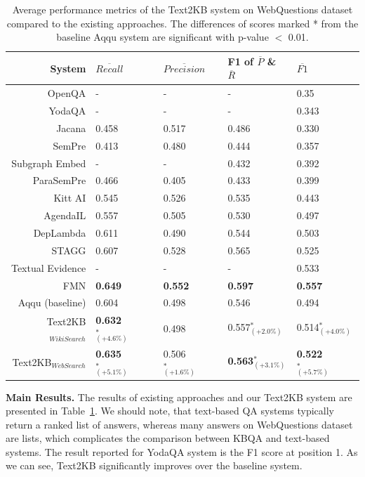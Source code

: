 \begin{table}[t]
\centering
\small
\begin{tabular}{rllll }
System & $\overline{Recall}$ & $\overline{Precision}$ & F1 of $\overline{P}$ \& $\overline{R}$ & $\overline{F1}$ \\
\hline
OpenQA \cite{Fader:2014:OQA:2623330.2623677} & - & - & - & 0.35 \\
YodaQA \cite{baudivs2015yodaqa} & - & - & - & 0.343 \\
\hline
Jacana \cite{YaoD14} & 0.458 & 0.517 & 0.486 & 0.330\\
SemPre \cite{BerantCFL13:sempre} & 0.413 & 0.480 & 0.444 & 0.357\\
Subgraph Embed \cite{BordesCW14:emnlp} & - & - & 0.432 & 0.392\\
ParaSemPre \cite{BerantL14:parasempre} & 0.466 & 0.405 & 0.433 & 0.399\\
Kitt AI \cite{yao-scratch-qa-naacl2015} & 0.545 & 0.526 & 0.535 & 0.443\\
AgendaIL \cite{berant2015imitation} & 0.557 & 0.505 & 0.530 & 0.497\\
DepLambda \cite{reddy2016transforming} & 0.611 & 0.490 & 0.544 & 0.503 \\
STAGG \cite{yih2014semantic} & 0.607 & 0.528 & 0.565 & 0.525\\
Textual Evidence\cite{xu2016enhancing} & - & - & - & 0.533 \\
FMN \cite{jain2016question} & \textbf{0.649} & \textbf{0.552} & \textbf{0.597} & \textbf{0.557}\\
\hline
Aqqu (baseline) \cite{bastmore:cikm:2015:aquu} & 0.604 & 0.498 & 0.546 & 0.494\\
Text2KB$_{Wiki Search}$ & \textbf{0.632}$_{(+4.6\%)}^*$  & 0.498 & 0.557$_{(+2.0\%)}^*$ & 0.514$_{(+4.0\%)}^*$ \\
Text2KB$_{Web Search}$ & \textbf{0.635}$_{(+5.1\%)}^*$ & 0.506$_{(+1.6\%)}^*$ & \textbf{0.563}$_{(+3.1\%)}^*$ & \textbf{0.522}$_{(+5.7\%)}^*$ \\
\end{tabular}
\caption{Average performance metrics of the Text2KB system on WebQuestions dataset compared to the existing approaches. The differences of scores marked * from the baseline Aqqu system are significant with p-value $<$ 0.01.}
\label{table:factoid:text2kb:webquestions_results}
\end{table}

\textbf{Main Results.}
The results of existing approaches and our Text2KB system are presented in Table~\ref{table:factoid:text2kb:webquestions_results}.
We should note, that text-based QA systems typically return a ranked list of answers, whereas many answers on WebQuestions dataset are lists, which complicates the comparison between KBQA and text-based systems.
The result reported for YodaQA system is the F1 score at position 1.
As we can see, Text2KB significantly improves over the baseline system.

